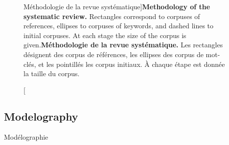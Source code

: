 \begin{figure}[h!]
\caption[Methodology of the systematic review][Méthodologie de la revue systématique]{\textbf{Methodology of the systematic review.} Rectangles correspond to corpuses of references, ellipses to corpuses of keywords, and dashed lines to initial corpuses. At each stage the size of the corpus is given.\label{fig:modelography:systematicreview}}{\textbf{Méthodologie de la revue systématique.} Les rectangles désignent des corpus de références, les ellipses des corpus de mot-clés, et les pointillés les corpus initiaux. À chaque étape est donnée la taille du corpus.\label{fig:modelography:systematicreview}}
\end{figure}




\subsection{Modelography}{Modélographie}


